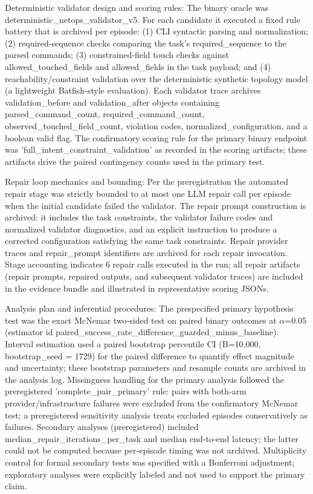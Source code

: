\documentclass[conference]{IEEEtran}
\begin{document}
Deterministic validator design and scoring rules: The binary oracle was deterministic\_netops\_validator\_v5. For each candidate it executed a fixed rule battery that is archived per episode: (1) CLI syntactic parsing and normalization; (2) required‑sequence checks comparing the task's required\_sequence to the parsed commands; (3) constrained‑field touch checks against allowed\_touched\_fields and allowed\_fields in the task payload; and (4) reachability/constraint validation over the deterministic synthetic topology model (a lightweight Batfish‑style evaluation). Each validator trace archives validation\_before and validation\_after objects containing parsed\_command\_count, required\_command\_count, observed\_touched\_field\_count, violation codes, normalized\_configuration, and a boolean valid flag. The confirmatory scoring rule for the primary binary endpoint was 'full\_intent\_constraint\_validation' as recorded in the scoring artifacts; these artifacts drive the paired contingency counts used in the primary test.

Repair loop mechanics and bounding: Per the preregistration the automated repair stage was strictly bounded to at most one LLM repair call per episode when the initial candidate failed the validator. The repair prompt construction is archived: it includes the task constraints, the validator failure codes and normalized validator diagnostics, and an explicit instruction to produce a corrected configuration satisfying the same task constraints. Repair provider traces and repair\_prompt identifiers are archived for each repair invocation. Stage accounting indicates 6 repair calls executed in the run; all repair artifacts (repair prompts, repaired outputs, and subsequent validator traces) are included in the evidence bundle and illustrated in representative scoring JSONs.

Analysis plan and inferential procedures: The prespecified primary hypothesis test was the exact McNemar two‑sided test on paired binary outcomes at \ensuremath{\alpha}=0.05 (estimator id paired\_success\_rate\_difference\_guarded\_minus\_baseline). Interval estimation used a paired bootstrap percentile CI (B=10,000, bootstrap\_seed = 1729) for the paired difference to quantify effect magnitude and uncertainty; these bootstrap parameters and resample counts are archived in the analysis log. Missingness handling for the primary analysis followed the preregistered 'complete\_pair\_primary' rule: pairs with both‑arm provider/infrastructure failures were excluded from the confirmatory McNemar test; a preregistered sensitivity analysis treats excluded episodes conservatively as failures. Secondary analyses (preregistered) included median\_repair\_iterations\_per\_task and median end‑to‑end latency; the latter could not be computed because per‑episode timing was not archived. Multiplicity control for formal secondary tests was specified with a Bonferroni adjustment; exploratory analyses were explicitly labeled and not used to support the primary claim.
\end{document}
